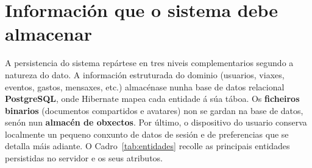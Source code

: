 \section{Información que o sistema debe almacenar}

A persistencia do sistema repártese en tres niveis complementarios segundo a natureza do
dato. A información estruturada do dominio (usuarios, viaxes, eventos, gastos, mensaxes,
etc.) almacénase nunha base de datos relacional \textbf{PostgreSQL}, onde Hibernate mapea
cada entidade á súa táboa. Os \textbf{ficheiros binarios} (documentos compartidos e
avatares) non se gardan na base de datos, senón nun \textbf{almacén de obxectos}. Por
último, o dispositivo do usuario conserva localmente un pequeno conxunto de datos de
sesión e de preferencias que se detalla máis adiante. O Cadro~\ref{tab:entidades} recolle
as principais entidades persistidas no servidor e os seus atributos.

